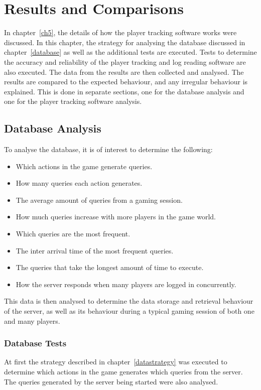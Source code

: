 \chapter{Results and Comparisons}
\label{results}

In chapter~\ref{ch5}, the details of how the player tracking software works were discussed. In this chapter, the strategy for analysing the database discussed in chapter~\ref{database} as well as the additional tests are executed. Tests to determine the accuracy and reliability of the player tracking and log reading software  are also executed. The data from the results are then collected and analysed. The results are compared to the expected behaviour, and any irregular behaviour is explained. This is done in separate sections, one for the database analysis and one for the player tracking software analysis.



\section{Database Analysis}
To analyse the database, it is of interest to determine the following:

\begin{itemize}
	\item Which actions in the game generate queries.
	\item How many queries each action generates.
	\item The average amount of queries from a gaming session.
	\item How much queries increase with more players in the game world.
	\item Which queries are the most frequent.
	\item The inter arrival time of the most frequent queries.
	\item The queries that take the longest amount of time to execute.
	\item How the server responds when many players are logged in concurrently.
\end{itemize}

This data is then analysed to determine the data storage and retrieval behaviour of the server, as well as its behaviour during a typical gaming session of both one and many players.

\subsection{Database Tests}
At first the strategy described in chapter~\ref{datastrategy} was executed to determine which actions in the game generates which queries from the server. The queries generated by the server being started were also analysed. 

